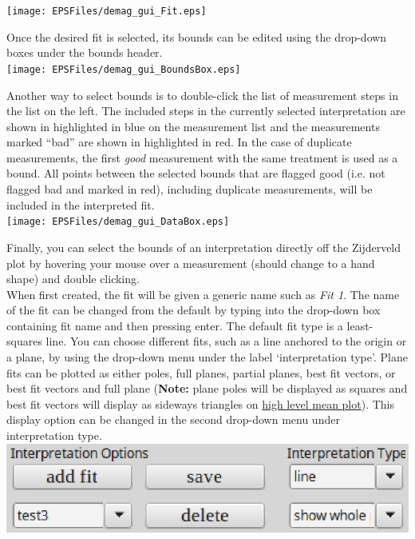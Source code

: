 \documentclass[11pt]{book}
\begin{document}
{{\texttt{[image: EPSFiles/demag\_gui\_Fit.eps]}

\noindent Once the desired fit is selected, its bounds can be edited using the drop-down boxes under the bounds header.\\

\texttt{[image: EPSFiles/demag\_gui\_BoundsBox.eps]}

\noindent Another way to select bounds is to double-click the list of measurement steps in the list on the left. The included steps in the currently selected interpretation are shown in highlighted in blue on the measurement list and the measurements marked ``bad'' are shown in highlighted in red. In the case of duplicate measurements, the first \emph{good} measurement with the same treatment is used as a bound. All points between the selected bounds that are flagged good (i.e. not flagged bad and marked in red), including duplicate measurements, will be included in the interpreted fit.\\

\texttt{[image: EPSFiles/demag\_gui\_DataBox.eps]}

\noindent Finally, you can select the bounds of an interpretation directly off the Zijderveld plot by hovering your mouse over a measurement (should change to a hand shape) and double clicking.\\

\noindent When first created, the fit will be given a generic name such as
\emph{Fit 1}. The name of the fit can be changed from the default by typing into the drop-down box containing fit name and then pressing enter. The default fit type is a least-squares line. You can choose different fits, such as a line anchored to the origin or a plane, by using the drop-down menu under the label `interpretation type'. Plane fits can be plotted as either poles, full planes, partial planes, best fit vectors, or best fit vectors and full plane ({\bf Note:} plane poles will be displayed as squares and best fit vectors will display as sideways triangles on \hyperref[higher-level-plots-and-interpretation]{high level mean plot}). This display option can be changed in the second drop-down menu under interpretation type.\\

\includegraphics[width=10 cm]{EPSFiles/demag_gui_SpecimenMeanType.eps}

}}
\end{document}
